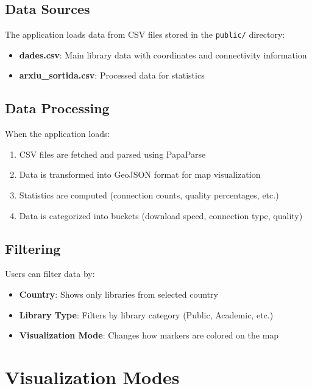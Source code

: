 \documentclass[11pt,a4paper]{article}
\begin{document}
\subsection{Data Sources}

The application loads data from CSV files stored in the \texttt{public/} directory:
\begin{itemize}
    \item \textbf{dades.csv}: Main library data with coordinates and connectivity information
    \item \textbf{arxiu\_sortida.csv}: Processed data for statistics
\end{itemize}

\subsection{Data Processing}

When the application loads:
\begin{enumerate}
    \item CSV files are fetched and parsed using PapaParse
    \item Data is transformed into GeoJSON format for map visualization
    \item Statistics are computed (connection counts, quality percentages, etc.)
    \item Data is categorized into buckets (download speed, connection type, quality)
\end{enumerate}

\subsection{Filtering}

Users can filter data by:
\begin{itemize}
    \item \textbf{Country}: Shows only libraries from selected country
    \item \textbf{Library Type}: Filters by library category (Public, Academic, etc.)
    \item \textbf{Visualization Mode}: Changes how markers are colored on the map
\end{itemize}

\section{Visualization Modes}
\end{document}
